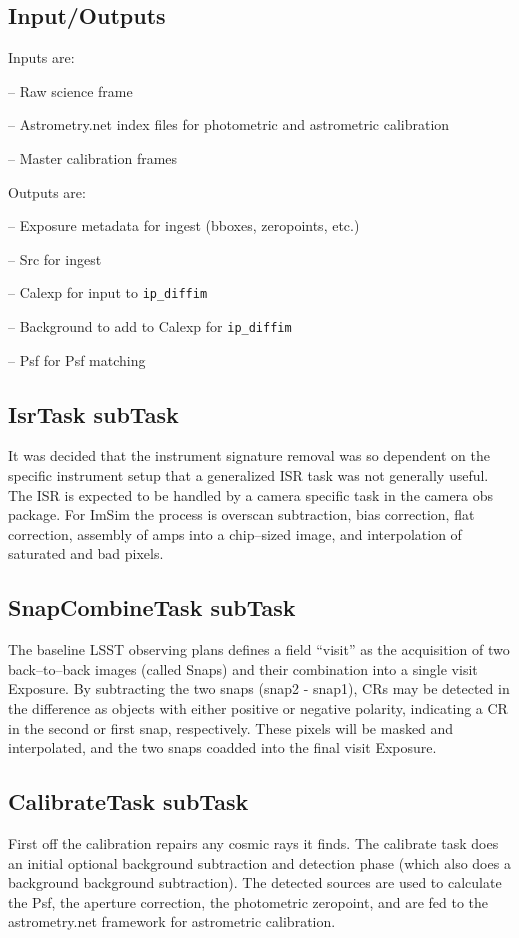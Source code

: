\documentclass[12pt]{article}
\begin{document}
\subsection{Input/Outputs}
Inputs are:

-- Raw science frame

-- Astrometry.net index files for photometric and astrometric calibration

-- Master calibration frames


Outputs are:

-- Exposure metadata for ingest (bboxes, zeropoints, etc.)

-- Src for ingest

-- Calexp for input to {\tt ip\_diffim}

-- Background to add to Calexp for {\tt ip\_diffim}

-- Psf for Psf matching

\subsection{IsrTask subTask}
It was decided that the instrument signature removal was so dependent on the specific instrument setup that a generalized
ISR task was not generally useful.  The ISR is expected to be handled by a camera specific task in the camera obs package.  
For ImSim the process is overscan subtraction, bias correction, flat correction, assembly of amps into a chip--sized image, 
and interpolation of saturated and bad pixels.

\subsection{SnapCombineTask subTask}
The baseline LSST observing plans defines a field ``visit'' as the
acquisition of two back--to--back images (called Snaps) and their
combination into a single visit Exposure.  By subtracting the two snaps
(snap2 - snap1), CRs may be detected in the difference as objects with
either positive or negative polarity, indicating a CR in the second or
first snap, respectively.  These pixels will be masked and
interpolated, and the two snaps coadded into the final visit Exposure.


\subsection{CalibrateTask subTask} 
First off the calibration repairs any cosmic rays it finds.
The calibrate task does an initial optional background subtraction and detection phase (which also does a background background subtraction).  The detected sources are used to calculate
the Psf, the aperture correction, the photometric zeropoint, and are fed to the astrometry.net framework for astrometric
calibration.
\end{document}
